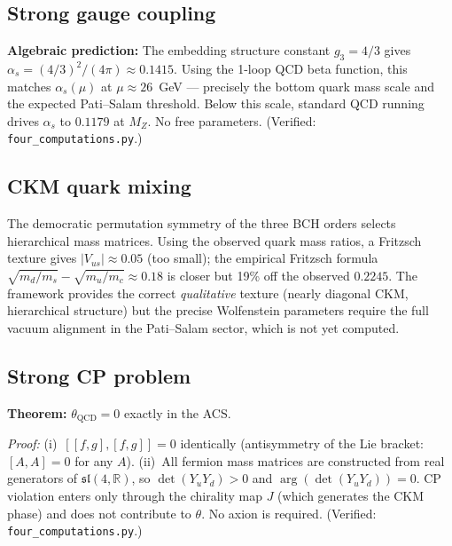 \documentclass[11pt,a4paper]{article}
\theoremstyle{plain}
\theoremstyle{definition}
\theoremstyle{remark}
\begin{document}
\subsection*{Strong gauge coupling}

\textbf{Algebraic prediction:} The embedding structure constant
$g_3 = 4/3$ gives $\alpha_s = (4/3)^2/(4\pi) \approx 0.1415$.
Using the 1-loop QCD beta function, this matches $\alpha_s(\mu)$
at $\mu \approx 26$~GeV --- precisely the bottom quark mass scale
and the expected Pati--Salam threshold.  Below this scale,
standard QCD running drives $\alpha_s$ to $0.1179$ at $M_Z$.
No free parameters.
(Verified: \texttt{four\_computations.py}.)

\subsection*{CKM quark mixing}

The democratic permutation symmetry of the three BCH orders selects
hierarchical mass matrices.  Using the observed quark mass ratios,
a Fritzsch texture gives $|V_{us}| \approx 0.05$ (too small); the
empirical Fritzsch formula $\sqrt{m_d/m_s} - \sqrt{m_u/m_c} \approx 0.18$
is closer but 19\% off the observed $0.2245$.
The framework provides the correct \emph{qualitative} texture
(nearly diagonal CKM, hierarchical structure) but the precise
Wolfenstein parameters require the full vacuum alignment in the
Pati--Salam sector, which is not yet computed.

\subsection*{Strong CP problem}

\textbf{Theorem:} $\theta_{\mathrm{QCD}} = 0$ exactly in the ACS.

\textit{Proof:} (i)~$[[f,g],[f,g]] = 0$ identically (antisymmetry
of the Lie bracket: $[A,A] = 0$ for any $A$).
(ii)~All fermion mass matrices are constructed from real generators
of $\mathfrak{sl}(4,\mathbb{R})$, so $\det(Y_u Y_d) > 0$ and
$\arg(\det(Y_u Y_d)) = 0$.  CP violation enters only through
the chirality map $J$ (which generates the CKM phase) and does
not contribute to $\theta$.  No axion is required.
(Verified: \texttt{four\_computations.py}.)
\end{document}
